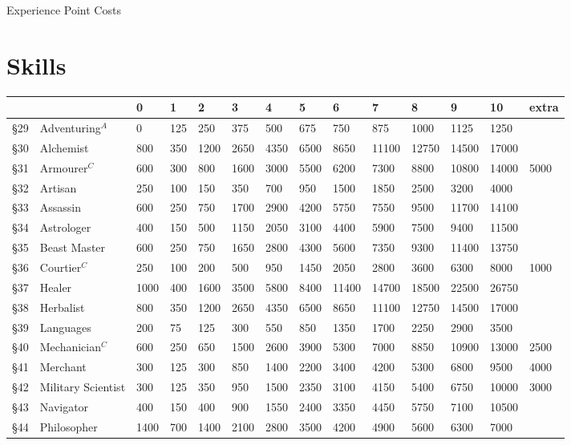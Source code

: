 \begin{Tables}{Experience Point Costs}
\section{Skills}

\begin{tabularx}{\linewidth}{llllllllllllll} \hline
	&			& 0	& 1	& 2	& 3	& 4	& 5	& 6	& 7	& 8	& 9	& 10	& extra \\ \hline
§29	& Adventuring$^A$	& 0	& 125	& 250	& 375	& 500	& 675	& 750	& 875	& 1000	& 1125	& 1250	&	\\
§30	& Alchemist		& 800	& 350	& 1200	& 2650	& 4350	& 6500	& 8650	& 11100	& 12750	& 14500	& 17000	&	\\
§31	& Armourer$^C$		& 600	& 300	& 800	& 1600	& 3000	& 5500	& 6200	& 7300	& 8800	& 10800	& 14000	& 5000	\\
§32	& Artisan		& 250	& 100	& 150	& 350	& 700	& 950	& 1500	& 1850	& 2500	& 3200	& 4000	&	\\
§33	& Assassin		& 600	& 250	& 750	& 1700	& 2900	& 4200	& 5750	& 7550	& 9500	& 11700	& 14100	&	\\
§34	& Astrologer		& 400	& 150	& 500	& 1150	& 2050	& 3100	& 4400	& 5900	& 7500	& 9400	& 11500	&	\\
§35	& Beast Master		& 600	& 250	& 750	& 1650	& 2800	& 4300	& 5600	& 7350	& 9300	& 11400	& 13750	&	\\
§36	& Courtier$^C$		& 250	& 100	& 200	& 500	& 950	& 1450	& 2050	& 2800	& 3600	& 6300	& 8000	& 1000	\\
§37	& Healer		& 1000	& 400	& 1600	& 3500	& 5800	& 8400	& 11400	& 14700	& 18500	& 22500	& 26750	&	\\
§38	& Herbalist		& 800	& 350	& 1200	& 2650	& 4350	& 6500	& 8650	& 11100	& 12750	& 14500	& 17000	&	\\
§39	& Languages		& 200	& 75	& 125	& 300	& 550	& 850	& 1350	& 1700	& 2250	& 2900	& 3500	&	\\
§40	& Mechanician$^C$	& 600	& 250	& 650	& 1500	& 2600	& 3900	& 5300	& 7000	& 8850	& 10900	& 13000	& 2500	\\
§41	& Merchant		& 300	& 125	& 300	& 850	& 1400	& 2200	& 3400	& 4200	& 5300	& 6800	& 9500	& 4000	\\
§42	& Military Scientist	& 300	& 125	& 350	& 950	& 1500	& 2350	& 3100	& 4150	& 5400	& 6750	& 10000	& 3000	\\
§43	& Navigator		& 400	& 150	& 400	& 900	& 1550	& 2400	& 3350	& 4450	& 5750	& 7100	& 10500	&	\\
§44	& Philosopher		& 1400	& 700	& 1400	& 2100	& 2800	& 3500	& 4200	& 4900	& 5600	& 6300	& 7000	&	\\

\end{tabularx}
\end{Tables}
